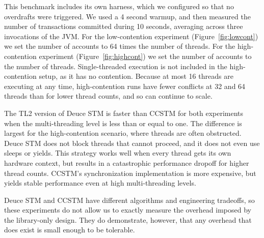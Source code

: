 This benchmark includes its own harness, which we configured so
that no overdrafts were triggered.  We used a 4 second warmup, and
then measured the number of transactions committed during 10 seconds,
averaging across three invocations of the JVM.  For the low-contention
experiment (Figure~\ref{fig:lowcont}) we set the number of accounts
to 64 times the number of threads.  For the high-contention experiment
(Figure~\ref{fig:highcont}) we set the number of accounts to the number of
threads.  Single-threaded execution is not included in the high-contention
setup, as it has no contention.  Because at most 16 threads are executing
at any time, high-contention runs have fewer conflicts at 32 and 64
threads than for lower thread counts, and so can continue to scale.

The TL2 version of Deuce STM is faster than CCSTM for both experiments when
the multi-threading level is less than or equal to one.  The difference
is largest for the high-contention scenario, where threads are often
obstructed.  Deuce STM does not block threads that cannot proceed, and it
does not even use sleeps or yields.  This strategy works well when every
thread gets its own hardware context, but results in a catastrophic
performance dropoff for higher thread counts.  CCSTM's synchronization
implementation is more expensive, but yields stable performance even at
high multi-threading levels.

Deuce STM and CCSTM have different algorithms and engineering tradeoffs,
so these experiments do not allow us to exactly measure the overhead
imposed by the library-only design.  They do demonstrate, however,
that any overhead that does exist is small enough to be tolerable.
